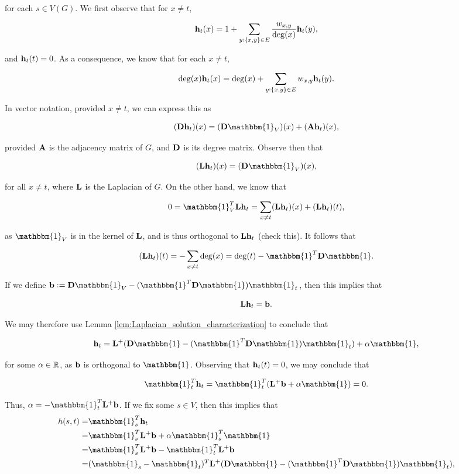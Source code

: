 \documentclass[11pt]{article}
\begin{document}
for each $s \in V(G)$. We first observe that for $x \neq t$,

\[
	\V{h}_{t}(x) = 1 + \sum_{y: \{x,y\} \in E} \frac{w_{x,y}}{\deg(x)} \V{h}_{t}(y),
\]

and $\V{h}_{t}(t)=0$. As a consequence, we know that for each $x \neq t$,

\[
	\deg(x) \V{h}_{t}(x) = \deg(x) + \sum_{y: \{x,y\} \in E} w_{x,y} \V{h}_{t}(y).
\]

In vector notation, provided $x\neq t$, we can express this as

\[
	(\V{D}\V{h}_{t})(x) = (\V{D}\mathbbm{1}_{V})(x) + (\V{A}\V{h}_{t})(x),
\]

provided $\V{A}$ is the adjacency matrix of $G$, and $\V{D}$ is its degree matrix. Observe then that

\[
	(\V{L}\V{h}_{t})(x)= (\V{D}\mathbbm{1}_{V})(x),
\]

for all $x\neq t$, where $\V{L}$ is the Laplacian of $G$. On the other hand, we know that

\[
	0 = \mathbbm{1}_{V}^{T} \V{L}\V{h}_{t}= \sum_{x \neq t}(\V{L}\V{h}_{t})(x) + (\V{L}\V{h}_{t})(t),
\]

as $\mathbbm{1}_{V}$ is in the kernel of $\V{L}$, and is thus orthogonal to $\V{L}\V{h}_{t}$ (check this). It follows that

\[
	(\V{L}\V{h}_{t})(t)= -\sum_{x\neq t}\deg(x) = \deg(t) - \mathbbm{1}^{T}\V{D}\mathbbm{1}.
\]

If we define $\V{b}:= \V{D}\mathbbm{1}_{V} - (\mathbbm{1}^{T}\V{D}\mathbbm{1})\mathbbm{1}_{t}$,
then this implies that

\[
	\V{L}\V{h}_{t}= \V{b}.
\]

We may therefore use Lemma \ref{lem:Laplacian_solution_characterization} to conclude that

\[
	\V{h}_{t} = \V{L}^{+}(\V{D}\mathbbm{1} - (\mathbbm{1}^{T}\V{D}\mathbbm{1})\mathbbm{1}_{t}) + \alpha\mathbbm{1},
\]

for some $\alpha \in \mathbb R$, as $\V{b}$ is orthogonal to $\mathbbm{1}$. Observing that
$\V{h}_{t}(t)=0$, we may conclude that

\[
	\mathbbm{1}_{t}^{T}\V{h}_{t}= \mathbbm{1}_{t}^{T}( \V{L}^{+}\V{b}+\alpha \mathbbm{1})=0.
\]

Thus, $\alpha = -\mathbbm{1}_{t}^{T}\V{L}^{+}\V{b}$. If we fix some $s \in V$,
then this implies that
\begin{align*}
h(s,t) =& \mathbbm{1}_{s}^{T}\V{h}_{t} 		\\
	=& \mathbbm{1}_{s}^{T}\V{L}^{+}\V{b} + \alpha \mathbbm{1}_{s}^{T} \mathbbm{1}	\\
	=& \mathbbm{1}_{s}^{T}\V{L}^{+}\V{b} - \mathbbm{1}_{t}^{T} \V{L}^{+} \V{b}		\\
	=&(\mathbbm{1}_{s}-\mathbbm{1}_{t})^{T} \V{L}^{+}(\V{D}\mathbbm{1} - (\mathbbm{1}^{T}\V{D}\mathbbm{1})\mathbbm{1}_{t}),
\end{align*}
\end{document}
